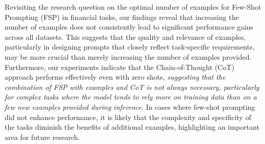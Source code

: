 \documentclass[logo,msc]{infthesis}           %
\begin{document}
Revisiting the research question on the optimal number of examples for Few-Shot Prompting (FSP) in financial tasks, our findings reveal that increasing the number of examples does not consistently lead to significant performance gains across all datasets. This suggests that the quality and relevance of examples, particularly in designing prompts that closely reflect task-specific requirements, may be more crucial than merely increasing the number of examples provided. Furthermore, our experiments indicate that the Chain-of-Thought (CoT) approach performs effectively even with zero shots, \emph{suggesting that the combination of FSP with examples and CoT is not always necessary, particularly for complex tasks where the model tends to rely more on training data than on a few new examples provided during inference}. In cases where few-shot prompting did not enhance performance, it is likely that the complexity and specificity of the tasks diminish the benefits of additional examples, highlighting an important area for future research.
\end{document}
